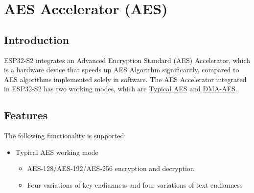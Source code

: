 \documentclass[main\_\_EN.tex]{subfiles}
\begin{document}
\setenglishformatting

\ifglobal
\else
    \listoftodos
    {\let\clearpage\relax \listofdonetodos}
    \tableofcontents
\fi




\hypertarget{aes}{}
\chapter{AES Accelerator (AES)}\label{mod:aes}

\section{Introduction}

ESP32-S2 integrates an Advanced Encryption Standard (AES) Accelerator, which is a hardware device that speeds up AES Algorithm significantly, compared to AES algorithms implemented solely in software. The AES Accelerator integrated in ESP32-S2 has two working modes, which are \hyperref[subsection:typicalaes]{Typical AES} and \hyperref[subsection:dma-aes]{DMA-AES}.

\section{Features}

The following functionality is supported:
\begin{itemize}
    \item Typical AES working mode
        \begin{itemize}
            \item AES-128/AES-192/AES-256 encryption and decryption
            \item Four variations of key endianness and four variations of text endianness
        \end{itemize}
    \end{itemize}
\end{document}
